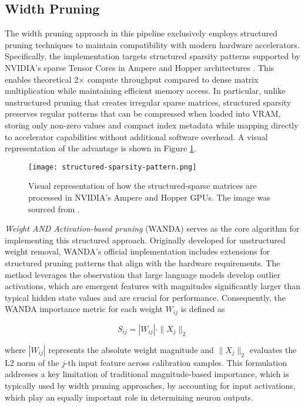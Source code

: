 \subsection{Width Pruning} \label{wanda}

The width pruning approach in this pipeline exclusively employs structured pruning techniques to maintain compatibility with modern hardware accelerators. Specifically, the implementation targets structured sparsity patterns supported by NVIDIA's sparse Tensor Cores in Ampere and Hopper architectures \cite{nvidia-width}. This enables theoretical 2$\times$ compute throughput compared to dense matrix multiplication while maintaining efficient memory access. In particular, unlike unstructured pruning that creates irregular sparse matrices, structured sparsity preserves regular patterns that can be compressed when loaded into VRAM, storing only non-zero values and compact index metadata while mapping directly to accelerator capabilities without additional software overhead. A visual representation of the advantage is shown in Figure \ref{fig:nvidia-width}.

\begin{figure}[htbp]
    \centering
    \texttt{[image: structured-sparsity-pattern.png]}
    \caption[Advantages of Structured Sparsity]{Visual representation of how the structured-sparse matrices are processed in NVIDIA's Ampere and Hopper GPUs. The image was sourced from \cite{nvidia-width}.}
    \label{fig:nvidia-width}
\end{figure}

\textit{Weight AND Activation-based pruning} (WANDA) \cite{wanda} serves as the core algorithm for implementing this structured approach. Originally developed for unstructured weight removal, WANDA's official implementation includes extensions for structured pruning patterns that align with the hardware requirements. The method leverages the observation that large language models develop outlier activations, which are emergent features with magnitudes significantly larger than typical hidden state values and are crucial for performance. Consequently, the WANDA importance metric for each weight $W_{ij}$ is defined as

\begin{equation}
S_{ij} = |W_{ij}| \cdot \|X_j\|_2
\end{equation}

where $|W_{ij}|$ represents the absolute weight magnitude and $\|X_j\|_2$ evaluates the L2 norm of the $j$-th input feature across calibration samples. This formulation addresses a key limitation of traditional magnitude-based importance, which is typically used by width pruning approaches, by accounting for input activations, which play an equally important role in determining neuron outputs.

